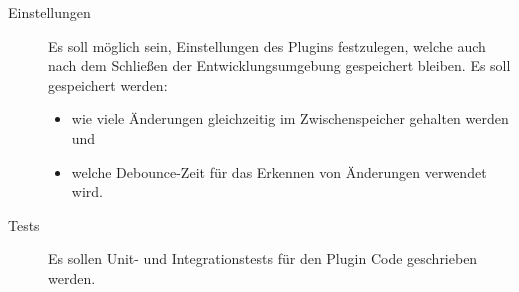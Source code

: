 \begin{description}
    \item[Einstellungen]
    Es soll möglich sein, Einstellungen des Plugins festzulegen, welche
    auch nach dem Schließen der Entwicklungsumgebung gespeichert bleiben.
    Es soll gespeichert werden:

    \begin{itemize}
        \item wie viele Änderungen gleichzeitig im 
            Zwischenspeicher gehalten werden und
        \item welche Debounce-Zeit für das Erkennen 
            von Änderungen verwendet wird. 
    \end{itemize}

    \item[Tests]
    Es sollen Unit- und Integrationstests für
    den Plugin Code geschrieben werden.

\end{description}


